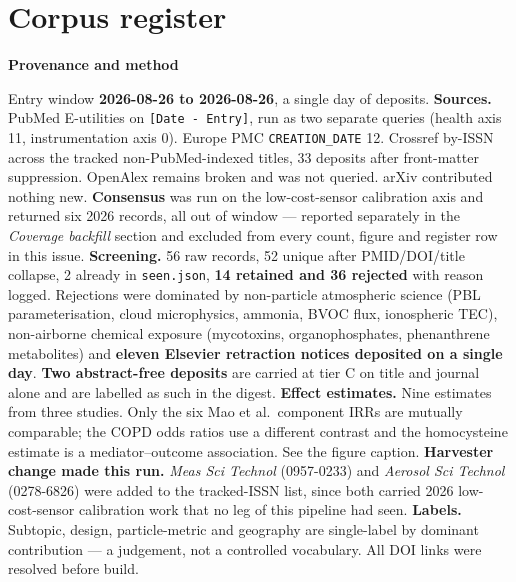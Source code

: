\documentclass[10pt]{article}
\begin{document}
\clearpage

\section*{\sffamily\bfseries\color{Deep}Corpus register}
\vspace{-1.5mm}{\color{Amber}\rule{\linewidth}{1.1pt}}\vspace{2.5mm}



\vspace{4mm}
\begin{keybox}
{\sffamily\bfseries\footnotesize\color{Deep}Provenance and method}\\[1.2mm]
{\fontsize{7.2}{8.8}\selectfont
Entry window \textbf{2026-08-26 to 2026-08-26}, a single day of deposits.
\textbf{Sources.} PubMed E-utilities on \texttt{[Date - Entry]}, run as two separate
queries (health axis 11, instrumentation axis 0). Europe PMC \texttt{CREATION\_DATE} 12.
Crossref by-ISSN across the tracked non-PubMed-indexed titles, 33 deposits after
front-matter suppression. OpenAlex remains broken and was not queried. arXiv contributed
nothing new. \textbf{Consensus} was run on the low-cost-sensor calibration axis and
returned six 2026 records, all out of window --- reported separately in the
\textit{Coverage backfill} section and excluded from every count, figure and register row
in this issue.
\textbf{Screening.} 56 raw records, 52 unique after PMID/DOI/title collapse, 2 already in
\texttt{seen.json}, \textbf{14 retained and 36 rejected} with reason logged. Rejections
were dominated by non-particle atmospheric science (PBL parameterisation, cloud
microphysics, ammonia, BVOC flux, ionospheric TEC), non-airborne chemical exposure
(mycotoxins, organophosphates, phenanthrene metabolites) and \textbf{eleven Elsevier
retraction notices deposited on a single day}.
\textbf{Two abstract-free deposits} are carried at tier C on title and journal alone and
are labelled as such in the digest.
\textbf{Effect estimates.} Nine estimates from three studies. Only the six Mao et al.\
component IRRs are mutually comparable; the COPD odds ratios use a different contrast and
the homocysteine estimate is a mediator--outcome association. See the figure caption.
\textbf{Harvester change made this run.} \textit{Meas Sci Technol} (0957-0233) and
\textit{Aerosol Sci Technol} (0278-6826) were added to the tracked-ISSN list, since both
carried 2026 low-cost-sensor calibration work that no leg of this pipeline had seen.
\textbf{Labels.} Subtopic, design, particle-metric and geography are single-label by
dominant contribution --- a judgement, not a controlled vocabulary. All DOI links were
resolved before build.\par}
\end{keybox}
\end{document}
